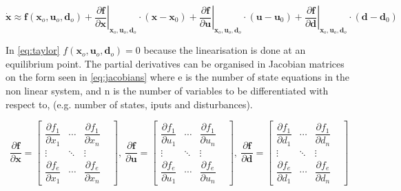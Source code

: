 \begin{equation} \label{eq:taylor}
	\dot{\textbf{x}}   \approx   \textbf{f}(\textbf{x}_o, \textbf{u}_o, \textbf{d}_o)   +
	\left. \dfrac{\partial \textbf{f}}{\partial \textbf{x}} \right |_{\textbf{x}_o, \textbf{u}_o, \textbf{d}_o} \cdot (\textbf{x}-\textbf{x}_0) +
	\left. \dfrac{\partial \textbf{f}}{\partial \textbf{u}} \right |_{\textbf{x}_o, \textbf{u}_o, \textbf{d}_o} \cdot (\textbf{u}-\textbf{u}_0) +
	\left. \dfrac{\partial \textbf{f}}{\partial \textbf{d}} \right |_{\textbf{x}_o, \textbf{u}_o, \textbf{d}_o} \cdot (\textbf{d}-\textbf{d}_0)
\end{equation}

In \cref{eq:taylor} $f(\textbf{x}_o, \textbf{u}_o, \textbf{d}_o) = 0$ because the linearisation is done at an equilibrium point. The partial derivatives can be organised in Jacobian matrices on the form seen in \cref{eq:jacobians} where e is the number of state equations in the non linear system, and n is the number of variables to be differentiated with respect to, (e.g. number of states, iputs and disturbances).

\begin{equation} \label{eq:jacobians}
	\dfrac{\partial \textbf{f}}{\partial \textbf{x}} =
		\begin{bmatrix}
			\dfrac{\partial f_1}{\partial x_1} & \cdots & \dfrac{\partial f_1}{\partial x_n} & \\
			\vdots & \ddots & \vdots & \\
			\dfrac{\partial f_e}{\partial x_1} & \cdots & \dfrac{\partial f_e}{\partial x_n} &
		\end{bmatrix}, \
	\dfrac{\partial \textbf{f}}{\partial \textbf{u}} =
		\begin{bmatrix}
			\dfrac{\partial f_1}{\partial u_1} & \cdots & \dfrac{\partial f_1}{\partial u_n} & \\
			\vdots & \ddots & \vdots & \\
			\dfrac{\partial f_e}{\partial u_1} & \cdots & \dfrac{\partial f_e}{\partial u_n} &
		\end{bmatrix}, \
	\dfrac{\partial \textbf{f}}{\partial \textbf{d}} =
		\begin{bmatrix}
			\dfrac{\partial f_1}{\partial d_1} & \cdots & \dfrac{\partial f_1}{\partial d_n} & \\
			\vdots & \ddots & \vdots & \\
			\dfrac{\partial f_e}{\partial d_1} & \cdots & \dfrac{\partial f_e}{\partial d_n} &
		\end{bmatrix}
\end{equation}



